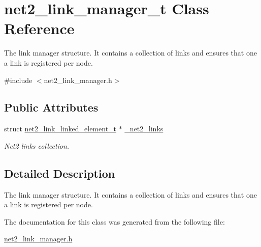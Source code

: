 \hypertarget{structnet2__link__manager__t}{\section{net2\-\_\-link\-\_\-manager\-\_\-t Class Reference}
\label{structnet2__link__manager__t}
}


The link manager structure. It contains a collection of links and ensures that one a link is registered per node.  




{\ttfamily \#include $<$net2\-\_\-link\-\_\-manager.\-h$>$}

\subsection*{Public Attributes}
\begin{DoxyCompactItemize}
\item 
\hypertarget{structnet2__link__manager__t_a9ea69cae85f64a2cf1369dc73fbc7532}{struct \hyperlink{structnet2__link__linked__element__t}{net2\-\_\-link\-\_\-linked\-\_\-element\-\_\-t} $\ast$ \hyperlink{structnet2__link__manager__t_a9ea69cae85f64a2cf1369dc73fbc7532}{\-\_\-net2\-\_\-links}}\label{structnet2__link__manager__t_a9ea69cae85f64a2cf1369dc73fbc7532}

\begin{DoxyCompactList}\small\item\em Net2 links collection. \end{DoxyCompactList}\end{DoxyCompactItemize}


\subsection{Detailed Description}
The link manager structure. It contains a collection of links and ensures that one a link is registered per node. 

The documentation for this class was generated from the following file\-:\begin{DoxyCompactItemize}
\item 
\hyperlink{net2__link__manager_8h}{net2\-\_\-link\-\_\-manager.\-h}\end{DoxyCompactItemize}
